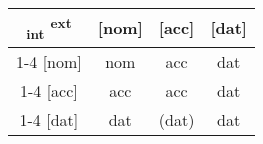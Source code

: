 
\begin{tabular}{c|c|c|c}
  \toprule
      \textsubscript{\ac{int}} \textsuperscript{\ac{ext}}
        & [\ac{nom}]
        & [\ac{acc}]
        & [\ac{dat}]
        \\ \cmidrule{1-4}
    [\ac{nom}]
        & \ac{nom}
        & \colorbox{DG}{\ac{acc}}
        & \colorbox{DG}{\ac{dat}}
        \\ \cmidrule{1-4}
    [\ac{acc}]
        & \colorbox{LG}{\ac{acc}}
        & \ac{acc}
        & \colorbox{DG}{\ac{dat}}
        \\ \cmidrule{1-4}
    [\ac{dat}]
        & \colorbox{LG}{\ac{dat}}
        & \colorbox{LG}{(\ac{dat})}
        & \ac{dat}
        \\
  \bottomrule
\end{tabular}
